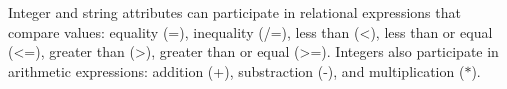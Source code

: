 \documentclass{llncs}
\begin{document}
Integer and string attributes can participate in relational expressions that compare values: equality (\textsf{=}), inequality (\textsf{/=}), less than (\textsf{<}), less than or equal (\textsf{<=}), greater than (\textsf{>}), greater than or equal (\textsf{>=}). Integers also participate in arithmetic expressions: addition (\textsf{+}), substraction (\textsf{-}), and multiplication (\textsf{$\ast$}).

\nocite{*}


\end{document}
